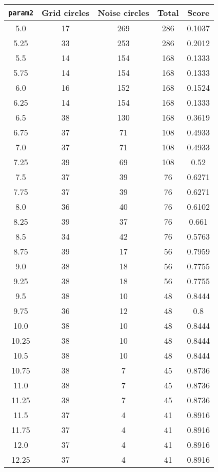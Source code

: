 \documentclass[letterpaper, 12pt]{article}
\begin{document}
\begin{longtable}{|c|c|c|c|c|}
\hline
\textbf{\texttt{param2}} & \textbf{Grid circles} & \textbf{Noise circles} & \textbf{Total} & \textbf{Score} \\
\hline
5.0 & 17 & 269 & 286 & 0.1037 \\
\hline
5.25 & 33 & 253 & 286 & 0.2012 \\
\hline
5.5 & 14 & 154 & 168 & 0.1333 \\
\hline
5.75 & 14 & 154 & 168 & 0.1333 \\
\hline
6.0 & 16 & 152 & 168 & 0.1524 \\
\hline
6.25 & 14 & 154 & 168 & 0.1333 \\
\hline
6.5 & 38 & 130 & 168 & 0.3619 \\
\hline
6.75 & 37 & 71 & 108 & 0.4933 \\
\hline
7.0 & 37 & 71 & 108 & 0.4933 \\
\hline
7.25 & 39 & 69 & 108 & 0.52 \\
\hline
7.5 & 37 & 39 & 76 & 0.6271 \\
\hline
7.75 & 37 & 39 & 76 & 0.6271 \\
\hline
8.0 & 36 & 40 & 76 & 0.6102 \\
\hline
8.25 & 39 & 37 & 76 & 0.661 \\
\hline
8.5 & 34 & 42 & 76 & 0.5763 \\
\hline
8.75 & 39 & 17 & 56 & 0.7959 \\
\hline
9.0 & 38 & 18 & 56 & 0.7755 \\
\hline
9.25 & 38 & 18 & 56 & 0.7755 \\
\hline
9.5 & 38 & 10 & 48 & 0.8444 \\
\hline
9.75 & 36 & 12 & 48 & 0.8 \\
\hline
10.0 & 38 & 10 & 48 & 0.8444 \\
\hline
10.25 & 38 & 10 & 48 & 0.8444 \\
\hline
10.5 & 38 & 10 & 48 & 0.8444 \\
\hline
10.75 & 38 & 7 & 45 & 0.8736 \\
\hline
11.0 & 38 & 7 & 45 & 0.8736 \\
\hline
11.25 & 38 & 7 & 45 & 0.8736 \\
\hline
11.5 & 37 & 4 & 41 & 0.8916 \\
\hline
11.75 & 37 & 4 & 41 & 0.8916 \\
\hline
12.0 & 37 & 4 & 41 & 0.8916 \\
\hline
12.25 & 37 & 4 & 41 & 0.8916 \\
\hline

\end{longtable}
\end{document}
